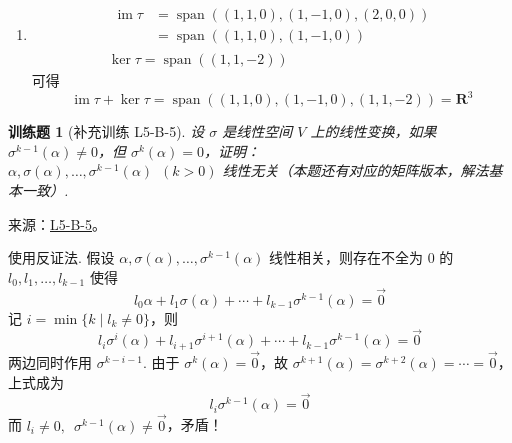 \documentclass[UTF8,12pt,a4paper,fontset=fandol]{ctexart}
\newtheorem{exercise}{训练题}[section]
\begin{document}
\begin{solve}
\begin{enumerate}
                \item \begin{gather*}
                          \begin{aligned}
                              \operatorname{im} \tau & = \operatorname{span}((1, 1, 0), (1, -1, 0), (2, 0, 0)) \\
                                       & = \operatorname{span}((1, 1, 0), (1, -1, 0))
                          \end{aligned} \\
                          \ker \tau = \operatorname{span}((1, 1, -2))
                      \end{gather*}
                      可得
                      \[ \operatorname{im} \tau + \ker \tau = \operatorname{span}((1, 1, 0), (1, -1, 0), (1, 1, -2)) = \mathbf{R}^3 \]
            \end{enumerate}
\end{solve}

\begin{exercise}[补充训练 L5-B-5]\label{prob:L5-B-5}
设 $\sigma$ 是线性空间 $V$ 上的线性变换，如果 $\sigma^{k-1}(\alpha) \neq 0$，但 $\sigma^{k}(\alpha) = 0$，证明：\\
        $\alpha,\sigma(\alpha),\ldots,\sigma^{k-1}(\alpha)\enspace(k>0)$ 线性无关（本题还有对应的矩阵版本，解法基本一致）.
\end{exercise}
\noindent 来源：\href{https://github.com/yhwu-is/Linear-Algebra-Left-Undone/blob/new/%E8%AE%B2%E4%B9%89/%E4%B8%93%E9%A2%98/5%20%E7%BA%BF%E6%80%A7%E6%98%A0%E5%B0%84.tex}{L5-B-5}。
\begin{solve}
使用反证法. 假设 $ \alpha, \sigma(\alpha), \ldots, \sigma^{k - 1}(\alpha) $ 线性相关，则存在不全为 0 的 $ l_0, l_1, \ldots, l_{k - 1} $ 使得
          \[ l_0 \alpha + l_1 \sigma(\alpha) + \cdots + l_{k - 1} \sigma^{k - 1}(\alpha) = \vec{0} \]
          记 $ i = \min\{k \mid l_k \neq 0\} $，则
          \[ l_i \sigma^{i}(\alpha) + l_{i + 1} \sigma^{i + 1}(\alpha) + \cdots + l_{k - 1} \sigma^{k - 1}(\alpha) = \vec{0} \]
          两边同时作用 $ \sigma^{k - i - 1} $. 由于 $ \sigma^{k}(\alpha) = \vec{0} $，故 $ \sigma^{k + 1}(\alpha) = \sigma^{k + 2}(\alpha) = \cdots = \vec{0} $，上式成为
          \[ l_i \sigma^{k - 1}(\alpha) = \vec{0} \]
          而 $ l_i \neq 0,\enspace \sigma^{k - 1}(\alpha) \neq \vec{0} $，矛盾！
\end{solve}
\end{document}
